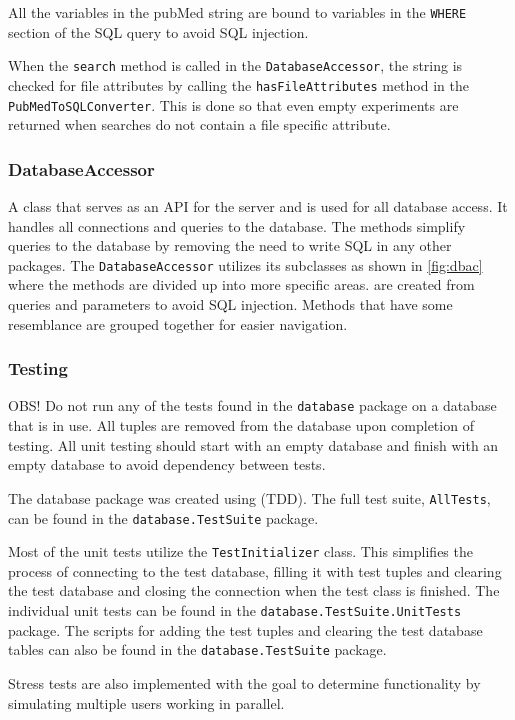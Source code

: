 All the variables in the pubMed string are bound to variables in the \texttt{WHERE} section of the SQL query to avoid SQL injection. 

When the \texttt{search} method is called in the \texttt{DatabaseAccessor}, the  string is checked for file attributes by calling the \texttt{hasFileAttributes} method in the \texttt{PubMedToSQLConverter}. This is done so that even empty experiments are returned when searches do not contain a file specific attribute.

\subsubsection{DatabaseAccessor}
A class that serves as an API for the server and is used for all database access. It handles all connections and queries to the database. The methods simplify queries to the database by removing the need to write SQL in any other packages. The \texttt{DatabaseAccessor} utilizes its subclasses as shown in \ref{fig:dbac} where the methods are divided up into more specific areas.  are created from queries and parameters to avoid SQL injection. Methods that have some resemblance are grouped together for easier navigation.

\subsubsection{Testing}
OBS! Do not run any of the tests found in the \texttt{database} package on a database that is in use. All tuples are removed from the database upon completion of testing. All unit testing should start with an empty database and finish with an empty database to avoid dependency between tests.

The database package was created using  (TDD). The full test suite, \texttt{AllTests}, can be found in the \texttt{database.TestSuite} package.

Most of the unit tests utilize the \texttt{TestInitializer} class. This simplifies the process of connecting to the test database, filling it with test tuples and clearing the test database and closing the connection when the test class is finished. 
The individual unit tests can be found in the \texttt{database.TestSuite.UnitTests} package. The scripts for adding the test tuples and clearing the test database tables can also be found in the \texttt{database.TestSuite} package.

Stress tests are also implemented with the goal to determine functionality by simulating multiple users working in parallel.

